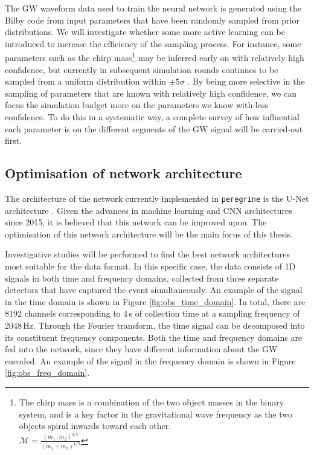 The GW waveform data used to train the neural network is generated using the Bilby code \cite{Ashton_Bilby_2019} from input parameters that have been randomly sampled from prior distributions. We will investigate whether some more active learning can be introduced to increase the efficiency of the sampling process. For instance, some parameters such as the chirp mass\footnote{The chirp mass is a combination of the two object masses in the binary system, and is a key factor in the gravitational wave frequency as the two objects spiral inwards toward each other.\\$\mathcal{M} = \frac{(m_1 \cdot m_2)^{3/5}}{(m_1 + m_2)^{1/5}}$} may be inferred early on with relatively high confidence, but currently in subsequent simulation rounds continues to be sampled from a uniform distribution within $\pm5\sigma$ \cite{Miller_TMNRE_2021}. By being more selective in the sampling of parameters that are known with relatively high confidence, we can focus the simulation budget more on the parameters we know with less confidence. To do this in a systematic way, a complete survey of how influential each parameter is on the different segments of the GW signal will be carried-out first.

\subsection{Optimisation of network architecture}

The architecture of the network currently implemented in \texttt{peregrine} is the U-Net architecture \cite{Ronneberger_UNet_2015}. Given the advances in machine learning and CNN architectures since 2015, it is believed that this network can be improved upon. The optimisation of this network architecture will be the main focus of this thesis. 

Investigative studies will be performed to find the best network architectures most suitable for the data format. In this specific case, the data consists of 1D signals in both time and frequency domains, collected from three separate detectors that have captured the event simultaneously. An example of the signal in the time domain is shown in Figure \ref{fig:obs_time_domain}. In total, there are 8192 channels corresponding to 4\,s of collection time at a sampling frequency of 2048\,Hz. Through the Fourier transform, the time signal can be decomposed into its constituent frequency components. Both the time and frequency domains are fed into the network, since they have different information about the GW encoded. An example of the signal in the frequency domain is shown in Figure \ref{fig:obs_freq_domain}.

